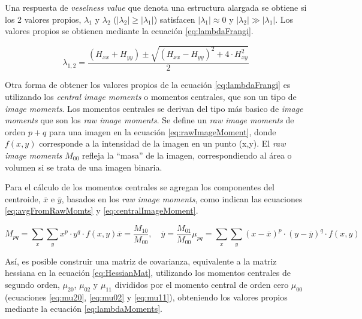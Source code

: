 Una respuesta de {\it veselness value} que denota una estructura alargada se obtiene si los 2 valores propios, $\lambda_1$ y $\lambda_2$ ($|\lambda_2| \geq |\lambda_1|$) satisfacen $|\lambda_1| \approx 0 $ y $|\lambda_2| \gg |\lambda_1|$. Los valores propios se obtienen mediante la ecuaci\'on \ref{eq:lambdaFrangi}.

\begin{equation}
    \label{eq:lambdaFrangi}
    \lambda_{1,2} = \dfrac{(H_{xx} + H_{yy}) \pm \sqrt{(H_{xx} - H_{yy})^{2} + 4\cdot H_{xy}^{2}     } }{2}
\end{equation}

Otra forma de obtener los valores propios de la ecuaci\'on \ref{eq:lambdaFrangi} es utilizando los {\it central image moments} o momentos centrales, que son un tipo de {\it image moments}. Los momentos centrales se derivan del tipo m\'as basico de {\it image moments} que son los {\it raw image moments}. Se define un {\it raw image moments} de orden $p+q$ para una imagen en la ecuaci\'on \ref{eq:rawImageMoment}, donde $f(x,y)$ corresponde a la intensidad de la imagen en un punto (x,y). El {\it raw image moments} $M_{00}$ refleja la ``masa'' de la imagen, correspondiendo al \'area o volumen si se trata de una imagen binaria. 

Para el c\'alculo de los momentos centrales se agregan los componentes del centroide, $\overline{x}$ e $\overline{y}$, basados en los {\it raw image moments}, como indican las ecuaciones \ref{eq:avgFromRawMomts} y \ref{eq:centralImageMoment}.

\begin{subequations}
\begin{equation}
    \label{eq:rawImageMoment}
    M_{pq} = \sum\limits_{x} \sum\limits_{y} x^p \cdot y^q \cdot f(x,y)
\end{equation}
\begin{equation}
    \label{eq:avgFromRawMomts}
    \overline{x} = \frac{M_{10}}{M_{00}}, \quad
    \overline{y} = \frac{M_{01}}{M_{00}}
\end{equation}
\begin{equation}
    \label{eq:centralImageMoment}
    \mu_{pq} = \sum\limits_{x} \sum\limits_{y} (x - \overline{x})^{p} \cdot (y - \overline{y})^{q} \cdot f(x,y)
\end{equation}
\end{subequations}

As\'i, es posible construir una matriz de covarianza, equivalente a la matriz hessiana en la ecuaci\'on \ref{eq:HessianMat}, utilizando los momentos centrales de segundo orden, $\mu_{20}$, $\mu_{02}$ y $\mu_{11}$ divididos por el momento central de orden cero $\mu_{00}$ (ecuaciones \ref{eq:mu20}, \ref{eq:mu02} y \ref{eq:mu11}), obteniendo los valores propios mediante la ecuaci\'on \ref{eq:lambdaMoments}.

